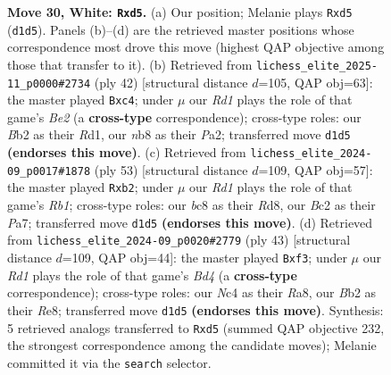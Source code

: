 \documentclass[11pt]{article}
\begin{document}
\begin{figure}[p]
\caption{\textbf{Move 30, White: \texttt{Rxd5}.} (a) Our position; Melanie plays \texttt{Rxd5} (\texttt{d1d5}). Panels (b)--(d) are the retrieved master positions whose correspondence most drove this move (highest QAP objective among those that transfer to it). (b) Retrieved from \texttt{lichess\_elite\_2025-11\_p0000\#2734} (ply 42) [structural distance $d$=105, QAP obj=63]: the master played \texttt{Bxc4}; under $\mu$ our \emph{Rd1} plays the role of that game's \emph{Be2} (a \textbf{cross-type} correspondence); cross-type roles: our \emph{B}b2 as their \emph{R}d1, our \emph{n}b8 as their \emph{P}a2; transferred move \texttt{d1d5} \textbf{(endorses this move)}. (c) Retrieved from \texttt{lichess\_elite\_2024-09\_p0017\#1878} (ply 53) [structural distance $d$=109, QAP obj=57]: the master played \texttt{Rxb2}; under $\mu$ our \emph{Rd1} plays the role of that game's \emph{Rb1}; cross-type roles: our \emph{b}c8 as their \emph{R}d8, our \emph{B}c2 as their \emph{P}a7; transferred move \texttt{d1d5} \textbf{(endorses this move)}. (d) Retrieved from \texttt{lichess\_elite\_2024-09\_p0020\#2779} (ply 43) [structural distance $d$=109, QAP obj=44]: the master played \texttt{Bxf3}; under $\mu$ our \emph{Rd1} plays the role of that game's \emph{Bd4} (a \textbf{cross-type} correspondence); cross-type roles: our \emph{N}c4 as their \emph{R}a8, our \emph{B}b2 as their \emph{R}e8; transferred move \texttt{d1d5} \textbf{(endorses this move)}. Synthesis: 5 retrieved analogs transferred to \texttt{Rxd5} (summed QAP objective 232, the strongest correspondence among the candidate moves); Melanie committed it via the \texttt{search} selector.}
\label{fig:thought-m58}
\end{figure}

\clearpage
\end{document}
